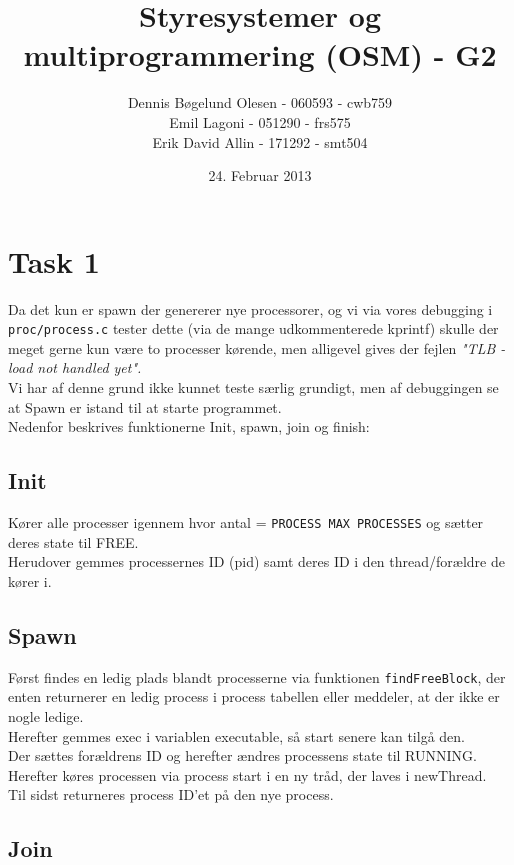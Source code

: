 \documentclass[a4paper,12pt]{article}
\title{Styresystemer og multiprogrammering (OSM) - G2}
\author{Dennis Bøgelund Olesen - 060593 - cwb759 \\ Emil Lagoni - 051290 - frs575 \\ Erik David Allin - 171292 - smt504}
\date{24. Februar 2013}
\begin{document}
\maketitle %
\thispagestyle{empty}
\setcounter{page}{0}
\newpage




\section*{Task 1}
Da det kun er spawn der genererer nye processorer, og vi via vores debugging i \texttt{proc/process.c} tester dette (via de mange udkommenterede kprintf) skulle der meget gerne kun være to processer kørende, men alligevel gives der fejlen \textit{"TLB - load not handled yet". }
\\
Vi har af denne grund ikke kunnet teste særlig grundigt, men af debuggingen se at Spawn er istand til at starte programmet. 
\\[5px]
Nedenfor beskrives funktionerne Init, spawn, join og finish:
\subsection*{Init}
Kører alle processer igennem hvor antal = \texttt{PROCESS MAX PROCESSES} og sætter deres state til FREE. 
\\
Herudover gemmes processernes ID (pid) samt deres ID i den thread/forældre de kører i. 


\subsection*{Spawn}
Først findes en ledig plads blandt processerne via funktionen \texttt{findFreeBlock}, der enten returnerer en ledig process i process tabellen eller meddeler, at der ikke er nogle ledige. 
\\
Herefter gemmes exec i variablen executable, så start senere kan tilgå den. \\
Der sættes forældrens ID og herefter ændres processens state til RUNNING.
\\
Herefter køres processen via process start i en ny tråd, der laves i newThread.
\\
Til sidst returneres process ID'et på den nye process.


\subsection*{Join}
\end{document}
